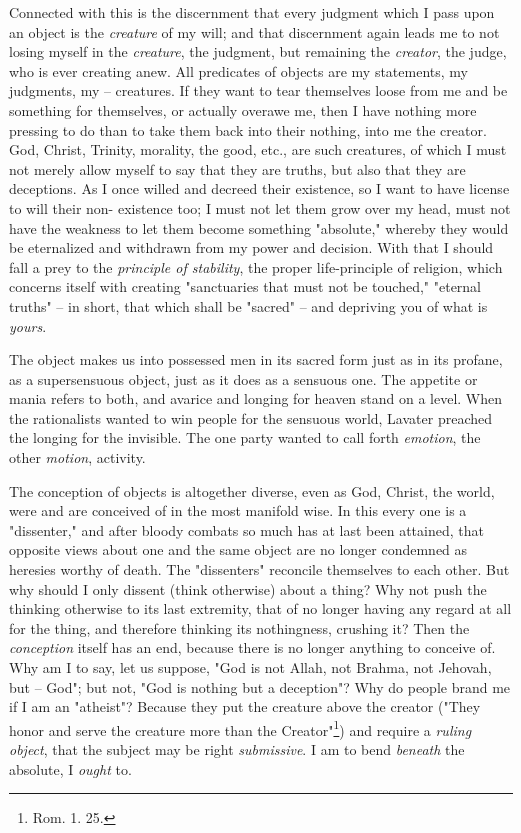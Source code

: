 \documentclass[a4paper]{book}
\begin{document}
Connected with this is the discernment that every judgment which I pass upon 
an object is the \textit{creature} of my will; and that discernment again 
leads me to not losing myself in the \textit{creature}, the judgment, but 
remaining the \textit{creator}, the judge, who is ever creating anew. All 
predicates of objects are my statements, my judgments, my -- creatures. If 
they want to tear themselves loose from me and be something for themselves, or 
actually overawe me, then I have nothing more pressing to do than to take them 
back into their nothing, into me the creator. God, Christ, Trinity, morality, 
the good, etc., are such creatures, of which I must not merely allow myself to 
say that they are truths, but also that they are deceptions. As I once willed 
and decreed their existence, so I want to have license to will their non- 
existence too; I must not let them grow over my head, must not have the 
weakness to let them become something "{}absolute,"{} whereby they would be 
eternalized and withdrawn from my power and decision. With that I should fall 
a prey to the \textit{principle of stability}, the proper life-principle of 
religion, which concerns itself with creating "{}sanctuaries that must not be 
touched,"{} "{}eternal truths"{} -- in short, that which shall be "{}sacred"{} 
-- and depriving you of what is \textit{yours}.

The object makes us into possessed men in its sacred form just as in its 
profane, as a supersensuous object, just as it does as a sensuous one. The 
appetite or mania refers to both, and avarice and longing for heaven stand on 
a level. When the rationalists wanted to win people for the sensuous world, 
Lavater preached the longing for the invisible. The one party wanted to call 
forth \textit{emotion}, the other \textit{motion}, activity.

 The conception of objects is altogether diverse, even as God, Christ, the 
world, were and are conceived of in the most manifold wise. In this every one 
is a "{}dissenter,"{} and after bloody combats so much has at last been 
attained, that opposite views about one and the same object are no longer 
condemned as heresies worthy of death. The "{}dissenters"{} reconcile 
themselves to each other. But why should I only dissent (think otherwise) 
about a thing? Why not push the thinking otherwise to its last extremity, that 
of no longer having any regard at all for the thing, and therefore thinking 
its nothingness, crushing it? Then the \textit{conception} itself has an end, 
because there is no longer anything to conceive of. Why am I to say, let us 
suppose, "{}God is not Allah, not Brahma, not Jehovah, but -- God"{}; but not, 
"{}God is nothing but a deception"{}? Why do people brand me if I am an 
"{}atheist"{}? Because they put the creature above the creator ("{}They honor 
and serve the creature more than the Creator"{}\footnote{Rom. 1. 25.}) and 
require a \textit{ruling object}, that the subject may be right 
\textit{submissive}. I am to bend \textit{beneath} the absolute, I 
\textit{ought} to.
\end{document}
